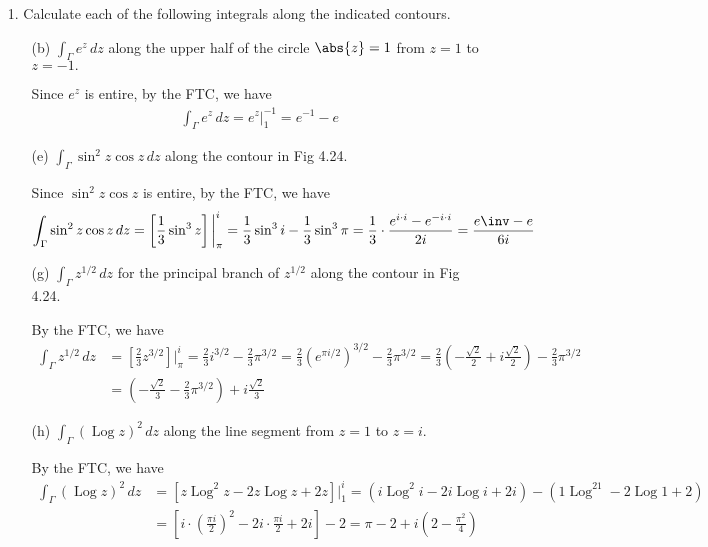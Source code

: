 \documentclass{article}
\DeclareMathOperator{\Log}{Log}
\begin{document}
\begin{itemize}
	\item[1.] Calculate each of the following integrals along the indicated contours.
		\begin{itemize}
			\item[(b)] $\int_\Gamma e^z\, dz$ along the upper half of the circle $\abs{z}=1$ from $z=1$ to $z=-1.$
				\begin{soln}
					Since $e^z$ is entire, by the FTC, we have
					\begin{align*}
						\int_\Gamma e^z\, dz = e^z\bigg|_1^{-1} = e^{-1} - e
					\end{align*}
				\end{soln}

			\item[(e)] $\int_\Gamma\sin^2z\cos z\, dz$ along the contour in Fig 4.24.
				\begin{soln}
					Since $\sin^2z\cos z$ is entire, by the FTC, we have
					\begin{align*}
						\int_\Gamma \sin^2z\cos z\, dz = \left[ \frac{1}{3}\sin^3z \right]\bigg|_{\pi}^{i} = \frac{1}{3}\sin^3 i - \frac{1}{3}\sin^3 \pi = \frac{1}{3} \cdot \frac{e^{i\cdot i} - e^{-i\cdot i}}{2i} = \frac{e\inv-e}{6i}
					\end{align*}
				\end{soln}

			\item[(g)] $\int_\Gamma z^{1/2}\, dz$ for the principal branch of $z^{1/2}$ along the contour in Fig 4.24.
				\begin{soln}
					By the FTC, we have
					\begin{align*}
						\int_\Gamma z^{1/2}\, dz &= \left[ \frac{2}{3} z^{3/2} \right]\bigg|_\pi^i = \frac{2}{3} i^{3/2} - \frac{2}{3} \pi^{3/2} = \frac{2}{3} (e^{\pi i/2})^{3/2} - \frac{2}{3} \pi^{3/2} = \frac{2}{3} \left( -\frac{\sqrt{2}}{2} + i\frac{\sqrt{2}}{2} \right) - \frac{2}{3} \pi^{3/2} \\
						&= \left( -\frac{\sqrt{2}}{3} - \frac{2}{3} \pi^{3/2} \right) +i \frac{\sqrt{2}}{3}
					\end{align*}
				\end{soln}

			\item[(h)] $\int_\Gamma(\Log z)^2\, dz$ along the line segment from $z=1$ to $z=i.$
				\begin{soln}
					By the FTC, we have
					\begin{align*}
						\int_\Gamma (\Log z)^2\, dz &= \left[ z\Log^2z - 2z\Log z + 2z \right]\bigg|_1^i = (i\Log^2i-2i\Log i + 2i) - \left( 1\Log^21-2\Log1 + 2 \right) \\
						&= \left[ i\cdot \left( \frac{\pi i}{2} \right)^2 - 2i\cdot \frac{\pi i}{2} + 2i \right] - 2 = \pi - 2 + i\left( 2-\frac{\pi^2}{4} \right)
					\end{align*}
				\end{soln}


\end{itemize}
\end{itemize}
\end{document}
